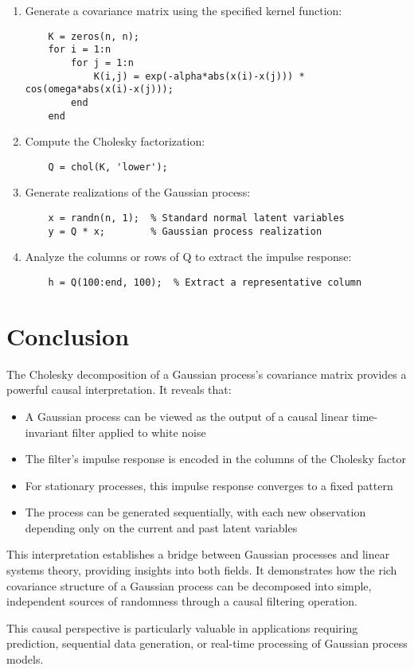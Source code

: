 \documentclass{article}
\begin{document}
\begin{enumerate}
    \item Generate a covariance matrix using the specified kernel function:
    \begin{verbatim}
    K = zeros(n, n);
    for i = 1:n
        for j = 1:n
            K(i,j) = exp(-alpha*abs(x(i)-x(j))) * cos(omega*abs(x(i)-x(j)));
        end
    end
    \end{verbatim}
    
    \item Compute the Cholesky factorization:
    \begin{verbatim}
    Q = chol(K, 'lower');
    \end{verbatim}
    
    \item Generate realizations of the Gaussian process:
    \begin{verbatim}
    x = randn(n, 1);  % Standard normal latent variables
    y = Q * x;        % Gaussian process realization
    \end{verbatim}
    
    \item Analyze the columns or rows of Q to extract the impulse response:
    \begin{verbatim}
    h = Q(100:end, 100);  % Extract a representative column
    \end{verbatim}
\end{enumerate}

\section{Conclusion}

The Cholesky decomposition of a Gaussian process's covariance matrix provides a powerful causal interpretation. It reveals that:

\begin{itemize}
    \item A Gaussian process can be viewed as the output of a causal linear time-invariant filter applied to white noise
    \item The filter's impulse response is encoded in the columns of the Cholesky factor
    \item For stationary processes, this impulse response converges to a fixed pattern
    \item The process can be generated sequentially, with each new observation depending only on the current and past latent variables
\end{itemize}

This interpretation establishes a bridge between Gaussian processes and linear systems theory, providing insights into both fields. It demonstrates how the rich covariance structure of a Gaussian process can be decomposed into simple, independent sources of randomness through a causal filtering operation.

This causal perspective is particularly valuable in applications requiring prediction, sequential data generation, or real-time processing of Gaussian process models.
\end{document}
